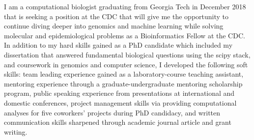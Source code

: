 

\begin{cventries}


\fontsize{10pt}{1em}\bodyfontlight\upshape\color{black}\justify
I am a computational biologist graduating from Georgia Tech in December 2018 that is seeking a position at the CDC that will give me the opportunity to continue diving deeper into genomics and machine learning while solving molecular and epidemiological problems as a Bioinformatics Fellow at the CDC. In addition to my hard skills gained as a PhD candidate which included my dissertation that answered fundamental biological questions using the scipy stack, and coursework in genomics and computer science, I developed the following soft skills: team leading experience gained as a laboratory-course teaching assistant, mentoring experience through a graduate-undergraduate mentoring scholarship program, public speaking experience from presentations at international and domestic conferences, project management skills via providing computational analyses for five coworkers' projects during PhD candidacy, and written communication skills sharpened through academic journal article and grant writing.
    
\vspace{-2.0mm}
\end{cventries}
